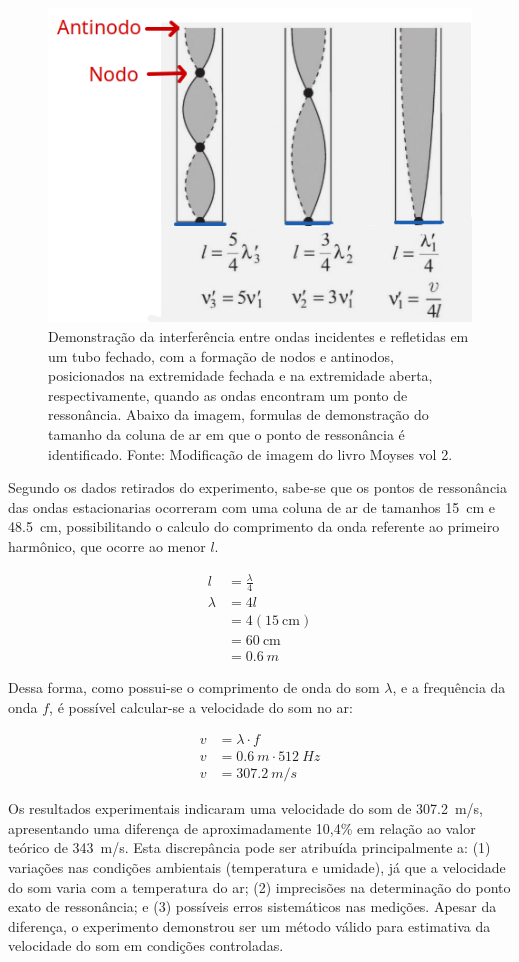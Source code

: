 \begin{figure}[H]
    \centering
    \includegraphics[width=0.35\linewidth]{fig/NodoEAntinodo.png}
    \caption{Demonstração da interferência entre ondas incidentes e refletidas em um tubo fechado, com a formação de nodos e antinodos, posicionados na extremidade fechada e na extremidade aberta, respectivamente, quando as ondas encontram um ponto de ressonância. Abaixo da imagem, formulas de demonstração do tamanho da coluna de ar em que o ponto de ressonância é identificado. Fonte: Modificação de imagem do livro Moyses vol 2.}
    \label{NodoEAntinodo}
\end{figure}

Segundo os dados retirados do experimento, sabe-se que os pontos de ressonância das ondas estacionarias ocorreram com uma coluna de ar de tamanhos \qty{15}{cm} e \qty{48,5}{cm}, possibilitando o calculo do comprimento da onda referente ao primeiro harmônico, que ocorre ao menor \(l\).

\begin{align*}
    l &= \frac{\lambda}{4}\\
    \lambda &= 4l\\
            &= 4 (\qty{15}{\cm})\\
            &= \qty{60}{\cm}\\
            &= \qty{0,6}{m}
\end{align*}

Dessa forma, como possui-se o comprimento de onda do som \(\lambda\), e a frequência da onda \(f\), é possível calcular-se a velocidade do som no ar:

\begin{align*}
    v &= \lambda \cdot f\\
    v &= \qty{0,6}{m} \cdot \qty{512}{Hz} \\
    v &= \qty{307,2}{m/s}
\end{align*}

Os resultados experimentais indicaram uma velocidade do som de \qty{307,2}{m/s}, apresentando uma diferença de aproximadamente 10,4\% em relação ao valor teórico de \qty{343}{m/s}. Esta discrepância pode ser atribuída principalmente a: (1) variações nas condições ambientais (temperatura e umidade), já que a velocidade do som varia com a temperatura do ar; (2) imprecisões na determinação do ponto exato de ressonância; e (3) possíveis erros sistemáticos nas medições. Apesar da diferença, o experimento demonstrou ser um método válido para estimativa da velocidade do som em condições controladas.

